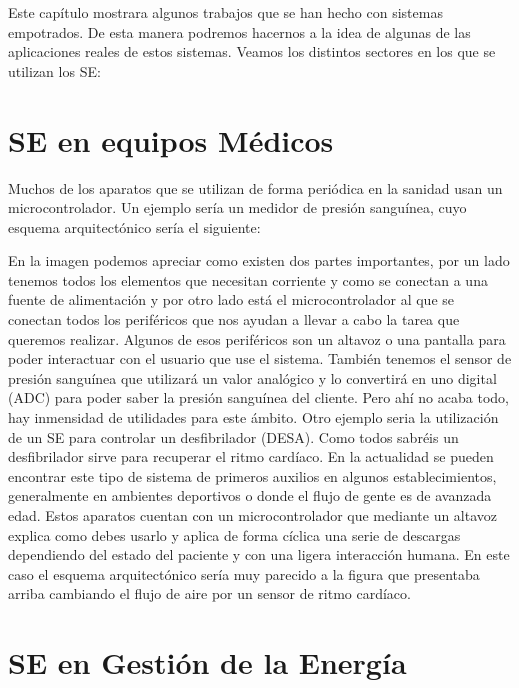 \label{cap:trabajosRelacionados}

Este capítulo mostrara algunos trabajos que se han hecho con sistemas empotrados. De esta manera podremos hacernos a la idea de algunas de las aplicaciones reales de estos sistemas. Veamos los distintos sectores en los que se utilizan los SE:

\section{SE en equipos Médicos}\label{sec:TREquiposMedicos}

Muchos de los aparatos que se utilizan de forma periódica en la sanidad usan un microcontrolador. Un ejemplo sería un medidor de presión sanguínea, cuyo esquema arquitectónico sería el siguiente:


En la imagen podemos apreciar como existen dos partes importantes, por un lado tenemos todos los elementos que necesitan corriente y como se conectan a una fuente de alimentación y por otro lado está el microcontrolador al que se conectan todos los periféricos que nos ayudan a llevar a cabo la tarea que queremos realizar. Algunos de esos periféricos son un altavoz o una pantalla para poder interactuar con el usuario que use el sistema. También tenemos el sensor de presión sanguínea que utilizará un valor analógico y lo convertirá en uno digital (ADC) para poder saber la presión sanguínea del cliente.
Pero ahí no acaba todo, hay inmensidad de utilidades para este ámbito. Otro ejemplo seria la utilización de un SE para controlar un desfibrilador (DESA). Como todos sabréis un desfibrilador sirve para recuperar el ritmo cardíaco. En la actualidad se pueden encontrar este tipo de sistema de primeros auxilios en algunos establecimientos, generalmente en ambientes deportivos o donde el flujo de gente es de avanzada edad. Estos aparatos cuentan con un microcontrolador que mediante un altavoz explica como debes usarlo y aplica de forma cíclica una serie de descargas dependiendo del estado del paciente y con una ligera interacción humana. En este caso el esquema arquitectónico sería muy parecido a la figura que presentaba arriba cambiando el flujo de aire por un sensor de ritmo cardíaco. 

\section{SE en Gestión de la Energía}\label{sec:TRGestionEnergetica}

